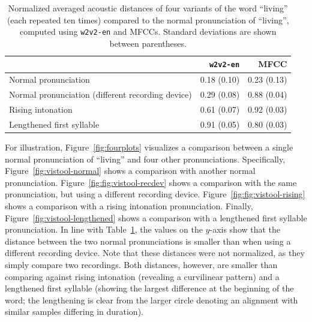 \documentclass[11pt,a4paper]{article}
\begin{document}
\begin{table}[ht]
\centering
  \begin{tabular}{lrr}
    \toprule
     & \textbf{\texttt{w2v2-en}} & \textbf{MFCC} \\
    \midrule
    Normal pronunciation & 0.18 (0.10) & 0.23 (0.13) \\
    Normal pronunciation (different recording device) & 0.29 (0.08) & 0.88 (0.04) \\
    Rising intonation & 0.61 (0.07) & 0.92 (0.03) \\
    Lengthened first syllable & 0.91 (0.05) & 0.80 (0.03) \\
    \bottomrule
  \end{tabular}
\caption{Normalized averaged acoustic distances of four variants of the word ``living'' (each repeated ten times) compared to the normal pronunciation of ``living'', computed using \texttt{w2v2-en} and MFCCs. Standard deviations are shown between parentheses.}
\label{table:living}
\end{table}

For illustration, Figure~\ref{fig:fourplots} visualizes a comparison between a single normal pronunciation of ``living'' and four other pronunciations. Specifically, Figure~\ref{fig:vistool-normal} shows a comparison with another normal pronunciation. Figure~\ref{fig:fig:vistool-recdev} shows a comparison with the same pronunciation, but using a different recording device. Figure~\ref{fig:fig:vistool-rising} shows a comparison with a rising intonation pronunciation. Finally, Figure~\ref{fig:vistool-lengthened} shows a comparison with a lengthened first syllable pronunciation. In line with Table~\ref{table:living}, the values on the $y$-axis show that the distance between the two normal pronunciations is smaller than when using a different recording device. Note that these distances were not normalized, as they simply compare two recordings. Both distances, however, are smaller than comparing against rising intonation (revealing a curvilinear pattern) and a lengthened first syllable (showing the largest difference at the beginning of the word; the lengthening is clear from the larger circle denoting an alignment with similar samples differing in duration).
\end{document}
